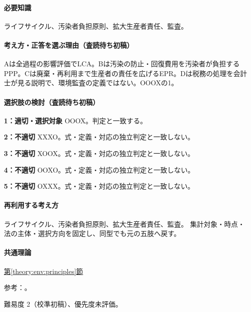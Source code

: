 \paragraph{必要知識} ライフサイクル、汚染者負担原則、拡大生産者責任、監査。

\paragraph{考え方・正答を選ぶ理由（査読待ち初稿）} Aは全過程の影響評価でLCA。Bは汚染の防止・回復費用を汚染者が負担するPPP。Cは廃棄・再利用まで生産者の責任を広げるEPR。Dは税務の処理を会計士が見る説明で、環境監査の定義ではない。OOOXの1。

\paragraph{選択肢の検討（査読待ち初稿）}\mbox{}\par

\noindent\textbf{1：適切・選択対象} OOOX。判定と一致する。\par

\noindent\textbf{2：不適切} XXXO。式・定義・対応の独立判定と一致しない。\par

\noindent\textbf{3：不適切} XOOX。式・定義・対応の独立判定と一致しない。\par

\noindent\textbf{4：不適切} OOXO。式・定義・対応の独立判定と一致しない。\par

\noindent\textbf{5：不適切} OXXX。式・定義・対応の独立判定と一致しない。\par

\paragraph{再利用する考え方} ライフサイクル、汚染者負担原則、拡大生産者責任、監査。 集計対象・時点・法の主体・選択方向を固定し、同型でも元の五肢へ戻す。

\paragraph{共通理論} \hyperref[theory:env:principles]{第\ref*{theory:env:principles}節}

\par 参考：\cite{env59_epr}。

\par 難易度 2（校準初稿）、優先度未評価。

